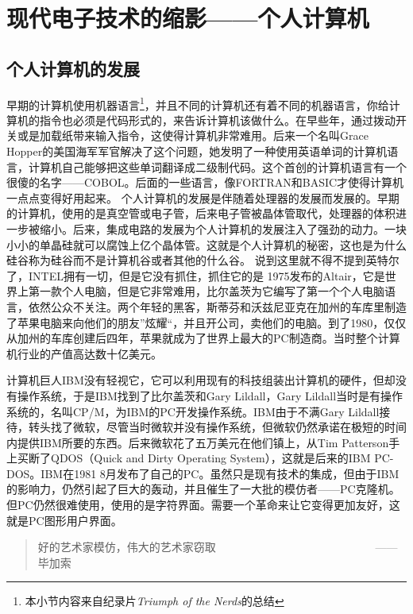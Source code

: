 \documentclass[a4paper]{ctexart}
\begin{document}
\section{现代电子技术的缩影——个人计算机}

\subsection{个人计算机的发展}
早期的计算机使用机器语言\footnote{本小节内容来自纪录片\emph{Triumph of the Nerds}的总结}，并且不同的计算机还有着不同的机器语言，你给计算机的指令也必须是代码形式的，来告诉计算机该做什么。在早些年，通过拨动开关或是加载纸带来输入指令，这使得计算机非常难用。后来一个名叫Grace Hopper的美国海军军官解决了这个问题，她发明了一种使用英语单词的计算机语言，计算机自己能够把这些单词翻译成二级制代码。这个首创的计算机语言有一个很傻的名字——COBOL。后面的一些语言，像FORTRAN和BASIC才使得计算机一点点变得好用起来。
个人计算机的发展是伴随着处理器的发展而发展的。早期的计算机，使用的是真空管或电子管，后来电子管被晶体管取代，处理器的体积进一步被缩小。后来，集成电路的发展为个人计算机的发展注入了强劲的动力。一块小小的单晶硅就可以腐蚀上亿个晶体管。这就是个人计算机的秘密，这也是为什么硅谷称为硅谷而不是计算机谷或者其他的什么谷。
说到这里就不得不提到英特尔了，INTEL拥有一切，但是它没有抓住，抓住它的是
1975发布的Altair，它是世界上第一款个人电脑，但是它非常难用，比尔盖茨为它编写了第一个个人电脑语言，依然公众不关注。两个年轻的黑客，斯蒂芬和沃兹尼亚克在加州的车库里制造了苹果电脑来向他们的朋友”炫耀“，并且开公司，卖他们的电脑。到了1980，仅仅从加州的车库创建后四年，苹果就成为了世界上最大的PC制造商。当时整个计算机行业的产值高达数十亿美元。

计算机巨人IBM没有轻视它，它可以利用现有的科技组装出计算机的硬件，但却没有操作系统，于是IBM找到了比尔盖茨和Gary Lildall，Gary Lildall当时是有操作系统的，名叫CP/M，为IBM的PC开发操作系统。IBM由于不满Gary Lildall接待，转头找了微软，尽管当时微软并没有操作系统，但微软仍然承诺在极短的时间内提供IBM所要的东西。后来微软花了五万美元在他们镇上，从Tim Patterson手上买断了QDOS（Quick and Dirty Operating System），这就是后来的IBM PC-DOS。IBM在1981 8月发布了自己的PC。虽然只是现有技术的集成，但由于IBM的影响力，仍然引起了巨大的轰动，并且催生了一大批的模仿者——PC克隆机。但PC仍然很难使用，使用的是字符界面。需要一个革命来让它变得更加友好，这就是PC图形用户界面。
\begin{quote}
\kaishu 好的艺术家模仿，伟大的艺术家窃取    　　　　　　　　　　　　　　\hfill               ——毕加索
\end{quote}
\end{document}
